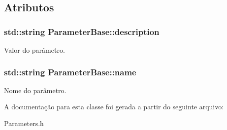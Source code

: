 \subsection{Atributos}
\hypertarget{class_parameter_base_a6947177ee16a3821c8541635247188c5}{
\subsubsection[{description}]{\setlength{\rightskip}{0pt plus 5cm}std\-::string Parameter\-Base\-::description}}\label{class_parameter_base_a6947177ee16a3821c8541635247188c5}
Valor do parâmetro. \hypertarget{class_parameter_base_a3e2e2ad34b89eabb0484b3a338133614}{
\subsubsection[{name}]{\setlength{\rightskip}{0pt plus 5cm}std\-::string Parameter\-Base\-::name}}\label{class_parameter_base_a3e2e2ad34b89eabb0484b3a338133614}
Nome do parâmetro. 

A documentação para esta classe foi gerada a partir do seguinte arquivo\-:\begin{DoxyCompactItemize}
\item 
Parameters.\-h\end{DoxyCompactItemize}
